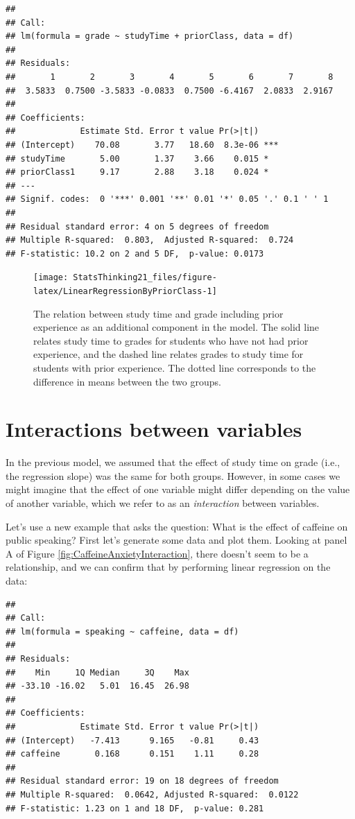 \documentclass[
  12pt,
]{book}
\begin{document}
\begin{verbatim}
## 
## Call:
## lm(formula = grade ~ studyTime + priorClass, data = df)
## 
## Residuals:
##       1       2       3       4       5       6       7       8 
##  3.5833  0.7500 -3.5833 -0.0833  0.7500 -6.4167  2.0833  2.9167 
## 
## Coefficients:
##             Estimate Std. Error t value Pr(>|t|)    
## (Intercept)    70.08       3.77   18.60  8.3e-06 ***
## studyTime       5.00       1.37    3.66    0.015 *  
## priorClass1     9.17       2.88    3.18    0.024 *  
## ---
## Signif. codes:  0 '***' 0.001 '**' 0.01 '*' 0.05 '.' 0.1 ' ' 1
## 
## Residual standard error: 4 on 5 degrees of freedom
## Multiple R-squared:  0.803,  Adjusted R-squared:  0.724 
## F-statistic: 10.2 on 2 and 5 DF,  p-value: 0.0173
\end{verbatim}

\begin{figure}
\texttt{[image: StatsThinking21\_files/figure-latex/LinearRegressionByPriorClass-1]} \caption{The relation between study time and grade including prior experience as an additional component in the model.  The solid line relates study time to grades for students who have not had prior experience, and the dashed line relates grades to study time for students with prior experience. The dotted line corresponds to the difference in means between the two groups.}\label{fig:LinearRegressionByPriorClass}
\end{figure}

\hypertarget{interactions-between-variables}{%
\section{Interactions between variables}\label{interactions-between-variables}}

In the previous model, we assumed that the effect of study time on grade (i.e., the regression slope) was the same for both groups. However, in some cases we might imagine that the effect of one variable might differ depending on the value of another variable, which we refer to as an \emph{interaction} between variables.

Let's use a new example that asks the question: What is the effect of caffeine on public speaking? First let's generate some data and plot them.
Looking at panel A of Figure \ref{fig:CaffeineAnxietyInteraction}, there doesn't seem to be a relationship, and we can confirm that by performing linear regression on the data:

\begin{verbatim}
## 
## Call:
## lm(formula = speaking ~ caffeine, data = df)
## 
## Residuals:
##    Min     1Q Median     3Q    Max 
## -33.10 -16.02   5.01  16.45  26.98 
## 
## Coefficients:
##             Estimate Std. Error t value Pr(>|t|)
## (Intercept)   -7.413      9.165   -0.81     0.43
## caffeine       0.168      0.151    1.11     0.28
## 
## Residual standard error: 19 on 18 degrees of freedom
## Multiple R-squared:  0.0642, Adjusted R-squared:  0.0122 
## F-statistic: 1.23 on 1 and 18 DF,  p-value: 0.281
\end{verbatim}
\end{document}
